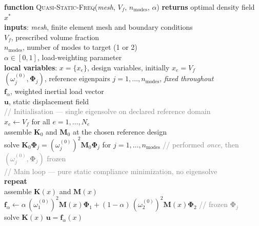 \documentclass[12pt,a4paper]{article}
\newcommand{\kw}[1]{\textbf{#1}}          %
\newcommand{\fn}[1]{\textsc{#1}}          %
\newcommand{\var}[1]{\textit{#1}}         %
\newcommand{\cm}[1]{\textcolor{gray}{#1}} %
\newcommand{\ind}{\hspace*{1.4em}}        %
\newcommand{\assign}{\ensuremath{\leftarrow}}%
\begin{document}
\medskip
\begin{algobox}
\kw{function} \fn{Quasi-Static-Freq}(\var{mesh}, $V_f$,
$n_{\mathrm{modes}}$, $\alpha$) \kw{returns} optimal density field $x^*$\\[2pt]
\ind\kw{inputs}: \var{mesh}, finite element mesh and boundary conditions\\
\ind\hspace*{4.2em}$V_f$, prescribed volume fraction\\
\ind\hspace*{4.2em}$n_{\mathrm{modes}}$, number of modes to target
  (1 or 2)\\
\ind\hspace*{4.2em}$\alpha \in [0,1]$, load-weighting parameter\\[2pt]
\ind\kw{local variables}:
  $x=\{x_e\}$, design variables, initially $x_e=V_f$\\
\ind\hspace*{9.5em}
  $(\omega_j^{(0)},\boldsymbol{\Phi}_j)$,
  reference eigenpairs $j=1,\ldots,n_{\mathrm{modes}}$,
  \emph{fixed throughout}\\
\ind\hspace*{9.5em}
  $\mathbf{f}_\alpha$, weighted inertial load vector\\
\ind\hspace*{9.5em}
  $\mathbf{u}$, static displacement field\\[6pt]
%
\cm{// Initialisation — single eigensolve on declared reference domain}\\
$x_e \assign V_f$ \quad for all $e = 1,\ldots,N_e$\\
assemble $\mathbf{K}_0$ and $\mathbf{M}_0$ at the chosen reference design\\
solve $\mathbf{K}_0\boldsymbol{\Phi}_j
      = (\omega_j^{(0)})^2\mathbf{M}_0\boldsymbol{\Phi}_j$
  \quad for $j=1,\ldots,n_{\mathrm{modes}}$
  \quad\cm{// performed \emph{once}, then $(\omega_j^{(0)},\boldsymbol{\Phi}_j)$ frozen}\\[4pt]
%
\cm{// Main loop — pure static compliance minimization, no eigensolve}\\
\kw{repeat}\\
\ind assemble $\mathbf{K}(\var{x})$ and $\mathbf{M}(\var{x})$\\
\ind $\mathbf{f}_\alpha \assign
  \alpha\,(\omega_1^{(0)})^2\mathbf{M}(\var{x})\boldsymbol{\Phi}_1
  + (1{-}\alpha)\,(\omega_2^{(0)})^2\mathbf{M}(\var{x})\boldsymbol{\Phi}_2$
  \quad\cm{// frozen $\boldsymbol{\Phi}_j$}\\
\ind solve $\mathbf{K}(\var{x})\,\mathbf{u} = \mathbf{f}_\alpha(\var{x})$\\

\end{algobox}
\end{document}

